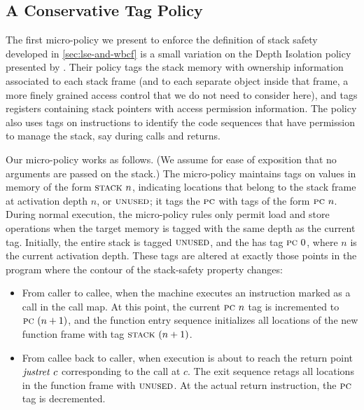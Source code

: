 \documentclass[acmsmall,review,anonymous]{acmart}\settopmatter{printfolios=true,printccs=false,printacmref=false}
\begin{document}
\subsection{A Conservative Tag Policy}
\label{sec:conservative}


The first micro-policy we present to enforce the definition of stack
safety developed in \cref{sec:lse-and-wbcf} is a small variation
on the Depth Isolation policy presented by
\citet{DBLP:conf/sp/RoesslerD18}. Their policy tags the stack memory
with ownership information associated to each stack frame (and to each
separate object inside that frame, a more finely grained access
control that we do not need to consider here), and tags registers containing
stack pointers with access permission information. The policy also
uses tags on instructions to identify the code
sequences that have permission to manage the stack, say during calls and returns.

Our micro-policy works as follows. (We assume for ease of exposition that no
arguments are passed on the stack.)
The micro-policy maintains tags on values in memory of the form $\textsc{stack} ~ n$,
indicating locations that belong to the stack frame at activation depth $n$,
or $\textsc{unused}$; it tags the $\textsc{pc}$ with tags of the form $\textsc{pc} ~ n$.
During normal execution, the micro-policy rules only permit load and store operations
when the target memory is tagged with the same depth as the current {\PCname} tag.
Initially, the entire stack is tagged $\textsc{unused}$,
and the {\PCname} has tag $\textsc{pc} ~ 0$, where $n$ is the current activation depth.
These tags are altered
at exactly those points in
the program where the contour of the stack-safety property changes:

\begin{itemize}

\item From caller to callee, when the machine executes an instruction marked as a call in
  the call map.
  At this point, the current
  $\textsc{pc} ~ n$ tag is incremented to $\textsc{pc} ~ (n + 1)$, and the function
  entry sequence initializes  all locations of the new function frame with
  tag $\textsc{stack} ~ (n + 1)$.

\item From callee back to caller, when execution is about to reach the return point
  $\mathit{justret}\ c$
  corresponding to the call at $c$.  The exit sequence retags all locations in the function
  frame with $\textsc{unused}$. At the actual return instruction, the
  $\textsc{pc}$ tag is decremented.

\end{itemize}
\end{document}
